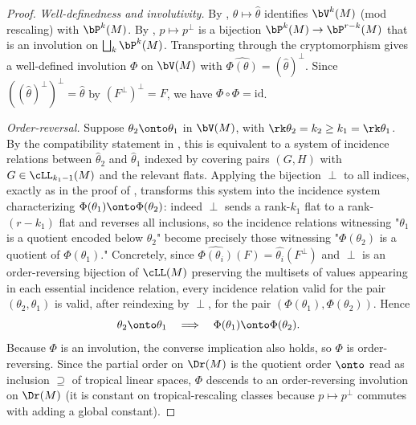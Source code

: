 \begin{proof}
\emph{Well-definedness and involutivity.}
By , $\theta\mapsto\widehat\theta$ identifies
$\bV^k(M)$ (mod rescaling) with $\bP^k(M)$. By
, $p\mapsto p^\perp$ is a bijection
$\bP^k(M)\to\bP^{r-k}(M)$ that is an involution on
$\bigsqcup_k\bP^k(M)$. Transporting through the cryptomorphism gives a well-defined
involution $\Phi$ on $\bV(M)$ with $\widehat{\Phi(\theta)}=(\widehat\theta)^\perp$.
Since $((\widehat\theta)^\perp)^\perp=\widehat\theta$ by
$(F^\perp)^\perp=F$, we have $\Phi\circ\Phi=\mathrm{id}$.

\emph{Order-reversal.}
Suppose $\theta_2\onto\theta_1$ in $\bV(M)$, with $\rk\theta_2=k_2\ge
k_1=\rk\theta_1$. By the compatibility statement in
, this is equivalent to a system of incidence
relations between $\widehat\theta_2$ and $\widehat\theta_1$ indexed by
covering pairs $(G,H)$ with $G\in\cLL_{k_1-1}(M)$ and the relevant flats. Applying
the bijection $\perp$ to all indices, exactly as in the proof of
, transforms this system into the incidence
system characterizing $\Phi(\theta_1)\onto\Phi(\theta_2)$: indeed $\perp$ sends a
rank-$k_1$ flat to a rank-$(r-k_1)$ flat and reverses all inclusions, so the
incidence relations witnessing "$\theta_1$ is a quotient encoded below
$\theta_2$" become precisely those witnessing "$\Phi(\theta_2)$ is a quotient of
$\Phi(\theta_1)$." Concretely, since $\widehat{\Phi(\theta_i)}(F)=
\widehat{\theta_i}(F^\perp)$ and $\perp$ is an order-reversing bijection of
$\cLL(M)$ preserving the multisets of values appearing in each essential
incidence relation, every incidence relation valid for the pair
$(\theta_2,\theta_1)$ is valid, after reindexing by $\perp$, for the pair
$(\Phi(\theta_1),\Phi(\theta_2))$. Hence
\[
\theta_2\onto\theta_1\quad\Longrightarrow\quad \Phi(\theta_1)\onto\Phi(\theta_2).
\]
Because $\Phi$ is an involution, the converse implication also holds, so
$\Phi$ is order-reversing. Since the partial order on $\Dr(M)$ is the quotient
order $\onto$ read as inclusion $\supseteq$ of tropical linear spaces, $\Phi$
descends to an order-reversing involution on $\Dr(M)$ (it is constant on
tropical-rescaling classes because $p\mapsto p^\perp$ commutes with adding a
global constant).


\end{proof}

